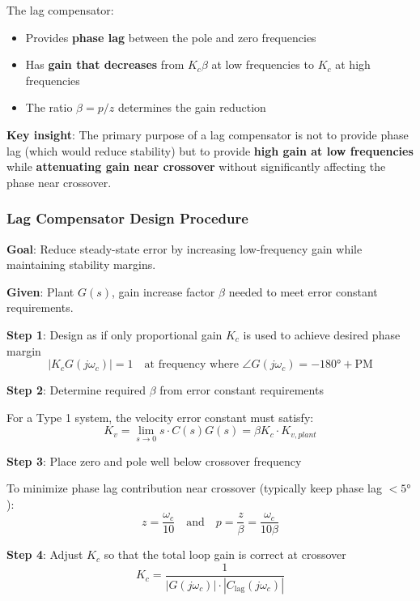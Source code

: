 The lag compensator:
\begin{itemize}
    \item Provides \textbf{phase lag} between the pole and zero frequencies
    \item Has \textbf{gain that decreases} from $K_c\beta$ at low frequencies to $K_c$ at high frequencies
    \item The ratio $\beta = p/z$ determines the gain reduction
\end{itemize}

\textbf{Key insight}: The primary purpose of a lag compensator is not to provide phase lag (which would reduce stability) but to provide \textbf{high gain at low frequencies} while \textbf{attenuating gain near crossover} without significantly affecting the phase near crossover.

\subsubsection{Lag Compensator Design Procedure}

\textbf{Goal}: Reduce steady-state error by increasing low-frequency gain while maintaining stability margins.

\textbf{Given}: Plant $G(s)$, gain increase factor $\beta$ needed to meet error constant requirements.

\textbf{Step 1}: Design as if only proportional gain $K_c$ is used to achieve desired phase margin
\begin{equation}
|K_c G(j\omega_c)| = 1 \quad \text{at frequency where } \angle G(j\omega_c) = -180° + \text{PM}
\end{equation}

\textbf{Step 2}: Determine required $\beta$ from error constant requirements

For a Type 1 system, the velocity error constant must satisfy:
\begin{equation}
K_v = \lim_{s \to 0} s \cdot C(s) G(s) = \beta K_c \cdot K_{v,plant}
\end{equation}

\textbf{Step 3}: Place zero and pole well below crossover frequency

To minimize phase lag contribution near crossover (typically keep phase lag $< 5°$):
\begin{equation}
z = \frac{\omega_c}{10} \quad \text{and} \quad p = \frac{z}{\beta} = \frac{\omega_c}{10\beta}
\end{equation}

\textbf{Step 4}: Adjust $K_c$ so that the total loop gain is correct at crossover
\begin{equation}
K_c = \frac{1}{|G(j\omega_c)| \cdot |C_{\text{lag}}(j\omega_c)|}
\end{equation}

